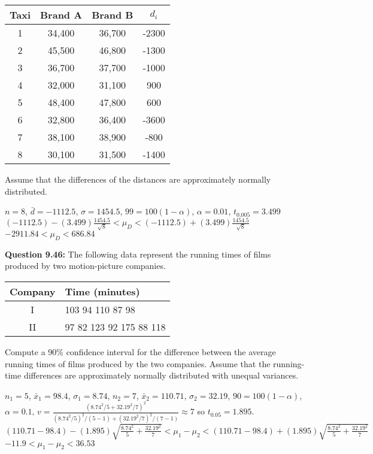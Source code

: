 \documentclass{article}
\begin{document}
\begin{center}
    \begin{tabular}{c c c c }
        Taxi  & Brand A & Brand B & $d_i$\\
        \hline
        1 & 34,400 & 36,700 & -2300\\
        2 & 45,500 & 46,800 & -1300\\
        3 & 36,700 & 37,700 & -1000\\
        4 & 32,000 & 31,100 &  900 \\
        5 & 48,400 & 47,800 &  600 \\
        6 & 32,800 & 36,400 & -3600\\
        7 & 38,100 & 38,900 & -800 \\
        8 & 30,100 & 31,500 & -1400\\
    \end{tabular}
\end{center}
Assume that the differences of the distances are 
approximately normally distributed.
\begin{description}
    \item $n=8$, $\bar{d}=-1112.5$, $\sigma=1454.5$, $99=100(1-\alpha)$, $\alpha=0.01$,
    $t_{0.005}=3.499$\\$(-1112.5)-(3.499)\frac{1454.5}{\sqrt{8}} < \mu_D < (-1112.5)+
    (3.499)\frac{1454.5}{\sqrt{8}}$\\
    \boldmath$-2911.84<\mu_D<686.84$
\end{description}
\textbf{Question 9.46:}
The following data represent the running times
of films produced by two motion-picture companies.
\begin{center}
\begin{tabular}{c | l}
    Company & Time (minutes)\\
    \hline
    I & 103 94 110 87 98 \\
    II & 97 82 123 92 175 88 118
\end{tabular}
\end{center}
Compute a 90\% confidence interval for the difference
between the average running times of films produced by
the two companies. Assume that the running-time 
differences are approximately normally distributed with
unequal variances.
\begin{description}
    \item $n_1=5$, $\bar{x}_1=98.4$, $\sigma_1=8.74$, $n_2=7$, $\bar{x}_2=110.71$, 
    $\sigma_2=32.19$, $90=100(1-\alpha)$, $\alpha=0.1$, 
    $v=\frac{(8.74^2/5 + 32.19^2/7)^2}{(8.74^2/5)^2/(5-1)+(32.19^2/7)^2/(7-1)}\approx 7$
    so $t_{0.05}=1.895$.\\
    $(110.71-98.4)-(1.895)\sqrt{\frac{8.74^2}{5}+\frac{32.19^2}{7}} < \mu_1-\mu_2 < 
    (110.71-98.4)+(1.895)\sqrt{\frac{8.74^2}{5}+\frac{32.19^2}{7}}$\\
    \boldmath$-11.9 < \mu_1-\mu_2 < 36.53$
\end{description}
\end{document}

